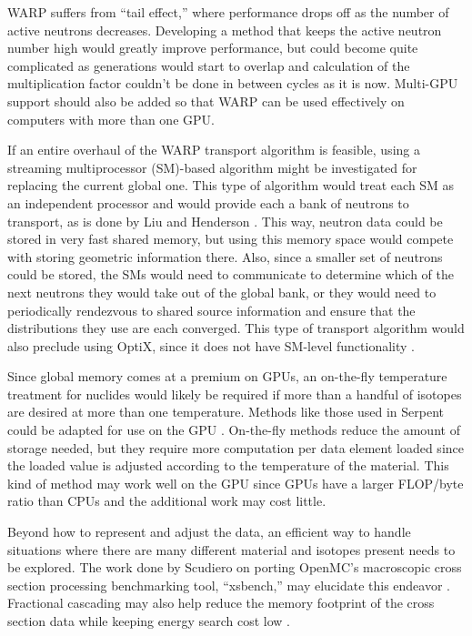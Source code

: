 \documentclass[preprint,12pt]{elsarticle}
\begin{document}
WARP suffers from ``tail effect,'' where performance drops off as the number of active neutrons decreases.  Developing a method that keeps the active neutron number high would greatly improve performance, but could become quite complicated as generations would start to overlap and calculation of the multiplication factor couldn't be done in between cycles  as it is now.  Multi-GPU support should also be added so that WARP can be used effectively on computers with more than one GPU.

If an entire overhaul of the WARP transport algorithm is feasible, using a streaming multiprocessor (SM)-based algorithm might be investigated for replacing the current global one.  This type of algorithm would treat each SM as an independent processor and would provide each a bank of neutrons to transport, as is done by Liu and Henderson \cite{tianyu,henderson}.   This way, neutron data could be stored in very fast shared memory, but using this memory space would compete with storing geometric information there.  Also, since a smaller set of neutrons could be stored, the SMs would need to communicate to determine which of the next neutrons they would take out of the global bank, or they would need to periodically rendezvous to shared source information and ensure that the distributions they use are each converged.  This type of transport algorithm would also preclude using OptiX, since it does not have SM-level functionality \cite{optix}.

Since global memory comes at a premium on GPUs, an on-the-fly temperature treatment for nuclides would likely be required if more than a handful of isotopes are desired at more than one temperature.  Methods like those used in Serpent could be adapted for use on the GPU \cite{serpent}.  On-the-fly methods reduce the amount of storage needed, but they require more computation per data element loaded since the loaded value is adjusted according to the temperature of the material.  This kind of method may work well on the GPU since GPUs have a larger FLOP/byte ratio than CPUs and the additional work may cost little.  

Beyond how to represent and adjust the data, an efficient way to handle situations where there are many different material and isotopes present needs to be explored.  The work done by Scudiero on porting OpenMC's macroscopic cross section processing benchmarking tool, ``xsbench,'' may elucidate this endeavor \cite{openmc,scudiero}.   Fractional cascading may also help reduce the memory footprint of the cross section data while keeping energy search cost low \cite{Lund2015}.
\end{document}
